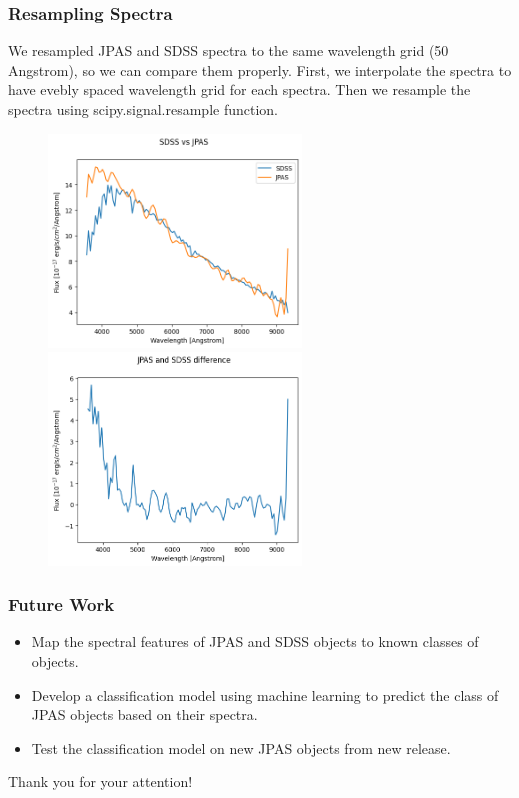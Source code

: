 \documentclass{beamer}
\begin{document}
\begin{frame}
    \frametitle{Resampling Spectra}
        We resampled JPAS and SDSS spectra to the same wavelength grid (50 Angstrom), so we can compare them properly.
        First, we interpolate the spectra to have evebly spaced wavelength grid for each spectra.
        Then we resample the spectra using scipy.signal.resample function.
        \begin{figure}
            \centering
            {   
                \includegraphics[width=0.6\textwidth]{../images/SDSS and JPAS.png}
            }
            {   
                \includegraphics[width=0.6\textwidth]{../images/SDSS and J-PAS difference.png}
            }
        \end{figure}
\end{frame}

\begin{frame}
\frametitle{Future Work}
\begin{itemize}
    \item Map the spectral features of JPAS and SDSS objects to known classes of objects.
    \item Develop a classification model using machine learning to predict the class of JPAS objects based on their spectra.
    \item Test the classification model on new JPAS objects from new release.
\end{itemize}
\end{frame}

\begin{frame}
\begin{center}
    \Huge Thank you for your attention!
\end{center}
\end{frame}
\end{document}
